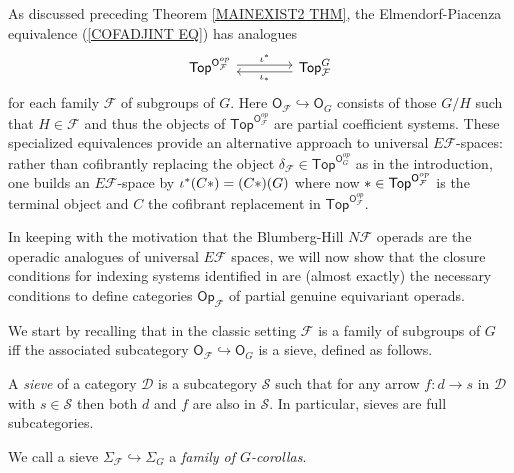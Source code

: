 \documentclass[a4paper,10pt]{article}%
\begin{document}
As discussed preceding Theorem \ref{MAINEXIST2 THM},
the Elmendorf-Piacenza equivalence
(\ref{COFADJINT EQ}) has analogues
\[
\begin{tikzcd}[column sep =4em,row sep=0.3em]
	\mathsf{Top}^{\mathsf{O}_{\mathcal{F}}^{op}}
	\ar[shift left=1]{r}{\iota^{\**}} 
&
	\mathsf{Top}_{\mathcal{F}}^G
	\ar[shift left=1]{l}{\iota_{\**}}
\end{tikzcd}
\]
for each family $\mathcal{F}$ of subgroups of $G$.
Here $\mathsf{O}_\mathcal{F} \hookrightarrow \mathsf{O}_G$ consists of those $G/H$ such that $H \in \mathcal{F}$ 
and thus the objects of
$\mathsf{Top}^{\mathsf{O}_{\mathcal{F}}^{op}}$
are partial coefficient systems.
These specialized equivalences provide an alternative approach to universal 
$E \mathcal{F}$-spaces: rather than cofibrantly replacing the object
$\delta_{\mathcal{F}} \in \mathsf{Top}^{\mathsf{O}_G^{op}}$
as in the introduction,
one builds an $E \mathcal{F}$-space by
$\iota^{\**}(C \**) = (C *) (G)$
where now $\** \in \mathsf{Top}^{\mathsf{O}_{\mathcal{F}}^{op}}$
is the terminal object and $C$ the cofibrant replacement in $\mathsf{Top}^{\mathsf{O}_{\mathcal{F}}^{op}}$.

In keeping with the motivation that the Blumberg-Hill $N \mathcal{F}$ operads are the operadic analogues of universal $E \mathcal{F}$ spaces,
we will now show that the closure conditions for 
indexing systems
identified in \cite[Def. 3.22]{BH15}
are (almost exactly) the necessary conditions to define categories 
$\mathsf{Op}_{\mathcal{F}}$
of partial genuine equivariant operads.

We start by recalling that 
in the classic setting
$\mathcal{F}$ is a family of subgroups of $G$
iff the associated subcategory 
$\mathsf{O}_{\mathcal{F}} \hookrightarrow
\mathsf{O}_G$ is a sieve, defined as follows.


\begin{definition}
	A \textit{sieve} of a category $\mathcal{D}$
	is a subcategory $\mathcal{S}$ such that
	for any arrow $f \colon d \to s$ in $\mathcal{D}$ with 
	$s \in \mathcal{S}$ then both $d$ and $f$ are also in $\mathcal{S}$. 
	In particular, sieves are full subcategories.
\end{definition}


\begin{definition}\label{FAMILY_COROLLAS_DEF}
      We call a sieve
      $\Sigma_{\mathcal{F}} \hookrightarrow \Sigma_G$
      a \textit{family of $G$-corollas}.
\end{definition}
\end{document}
